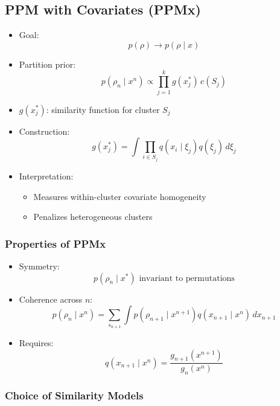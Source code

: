 \documentclass[12pt,oneside]{book}
\numberwithin{equation}{section}
\theoremstyle{definition}
\theoremstyle{plain}
\theoremstyle{remark}
\begin{document}
\subsection{PPM with Covariates (PPMx)}

\begin{itemize}
\item Goal:
\[
p(\rho) \rightarrow p(\rho \mid x)
\]

\item Partition prior:
\[
p(\rho_n \mid x^n) \propto \prod_{j=1}^k g(x_j^*) \, c(S_j)
\]

\item $g(x_j^*)$: similarity function for cluster $S_j$

\item Construction:
\[
g(x_j^*) = \int \prod_{i \in S_j} q(x_i \mid \xi_j) q(\xi_j)\, d\xi_j
\]

\item Interpretation:
\begin{itemize}
\item Measures within-cluster covariate homogeneity
\item Penalizes heterogeneous clusters
\end{itemize}
\end{itemize}

\subsubsection*{Properties of PPMx}

\begin{itemize}
\item Symmetry:
\[
p(\rho_n \mid x^*) \text{ invariant to permutations}
\]

\item Coherence across $n$:
\[
p(\rho_n \mid x^n)
=
\sum_{s_{n+1}} \int p(\rho_{n+1} \mid x^{n+1}) q(x_{n+1} \mid x^n)\, dx_{n+1}
\]

\item Requires:
\[
q(x_{n+1} \mid x^n) = \frac{g_{n+1}(x^{n+1})}{g_n(x^n)}
\]
\end{itemize}

\subsubsection*{Choice of Similarity Models}
\end{document}
